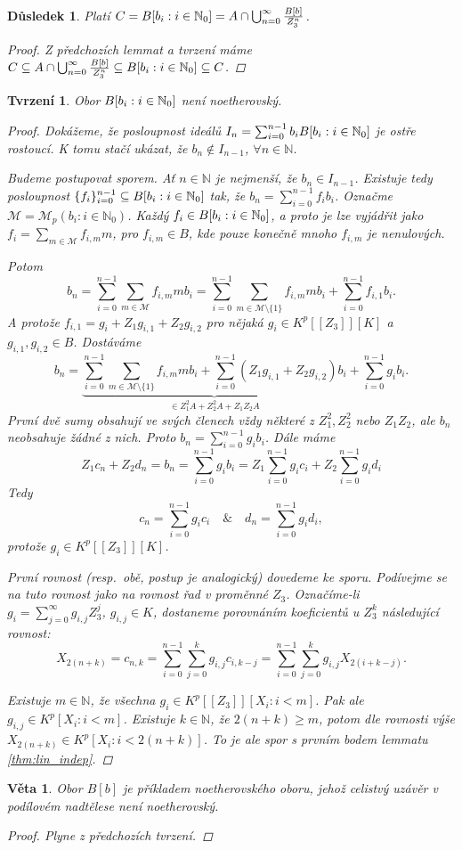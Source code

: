 \documentclass[11pt,a4paper]{article}
\newcommand\m[1]{\mathbb { #1 }} %
\newcommand\p[1]{\mathcal{ #1 }} %
\newcommand\N{\m N}
\newcommand*{\mld}[1]{\[#1\]} %
\newcounter{numb}
\theoremstyle{definition}
\theoremstyle{plain}
\newtheorem{veta}[numb]{Věta}
\newtheorem{tvrzeni}[numb]{Tvrzení}
\newtheorem{dusledek}[numb]{Důsledek}
\begin{document}
\begin{dusledek}
	Platí $C = \Ball = A \cap \bigcup_{n = 0}^\infty \frac{B[b]}{Z_3^n}$.
	
	\begin{proof}
		Z předchozích lemmat a tvrzení máme $C \subseteq A \cap \bigcup_{n = 0}^\infty \frac{B[b]}{Z_3^n} \subseteq \Ball \subseteq C$.
	\end{proof}
\end{dusledek}

\begin{tvrzeni}
	Obor $\Ball$ není noetherovský.
	
	\begin{proof}
		\newcommand*{\I}{_{i = 0}^{n - 1}}

		Dokážeme, že posloupnost ideálů $I_n = \sum\I b_i \Ball$ je ostře rostoucí. K tomu stačí ukázat, že $b_n \notin I_{n - 1}$, $\forall n \in \N$.

		Budeme postupovat sporem. Ať $n \in \N$ je nejmenší, že $b_n \in I_{n - 1}$. Existuje tedy posloupnost $\{f_i\}\I \subseteq \Ball$ tak, že $b_n = \sum\I f_i b_i$. Označme $\p M = \p M_p(b_i: i \in \N_0)$. Každý $f_i \in \Ball$, a proto je lze vyjádřit jako $f_i = \sum_{m \in \p M} f_{i, m} m$, pro $f_{i, m} \in B$, kde pouze konečně mnoho $f_{i, m}$ je nenulových.

		Potom
		\mld{
			b_n = \sum\I \sum_{m \in \p M} f_{i, m} m b_i = \sum\I \sum_{m \in \p M \setminus \{1\}} f_{i, m} m b_i + \sum\I f_{i, 1} b_i.
		}
		A protože $f_{i, 1} = g_i + Z_1 g_{i, 1} + Z_2 g_{i, 2}$ pro nějaká $g_i \in K^p[[Z_3]][K]$ a $g_{i, 1}, g_{i, 2} \in B$. Dostáváme
		\mld{
			b_n = \underbrace{\sum\I \sum_{m \in \p M \setminus \{1\}} f_{i, m} m b_i + \sum\I \left(Z_1 g_{i, 1} + Z_2 g_{i, 2}\right)b_i}_{\in Z_1^2 A + Z_2^2 A + Z_1 Z_2 A} + \sum\I g_i b_i.
		}
		První dvě sumy obsahují ve svých členech vždy některé z $Z_1^2, Z_2^2$ nebo
		$Z_1 Z_2$, ale $b_n$ neobsahuje žádné z nich. Proto $b_n = \sum\I g_i b_i$. Dále máme
		\mld{
			Z_1 c_n + Z_2 d_n = b_n = \sum\I g_i b_i = Z_1 \sum\I g_i c_i + Z_2 \sum\I g_i d_i
		}
		Tedy
		\mld{
			c_n = \sum\I g_i c_i \quad \& \quad d_n = \sum\I g_i d_i,
		}
		protože $g_i \in K^p[[Z_3]][K]$.

		První rovnost (resp.\ obě, postup je analogický) dovedeme ke sporu. Podívejme se na tuto rovnost jako na rovnost řad v proměnné $Z_3$. Označíme-li $g_i = \sum_{j = 0}^\infty g_{i, j} Z_3^j$, $g_{i, j} \in K$, dostaneme porovnáním koeficientů u $Z_3^k$ následující rovnost:
		\mld{
			X_{2(n + k)} = c_{n, k} = \sum\I \sum_{j = 0}^k g_{i, j} c_{i, k - j} = \sum\I \sum_{j = 0}^k g_{i, j} X_{2(i + k - j)}.
		}
		
		Existuje $m \in \N$, že všechna $g_i \in K^p[[Z_3]][X_i: i < m]$. Pak ale $g_{i, j} \in K^p[X_i: i < m]$. Existuje $k \in \N$, že $2(n + k) \geq m$, potom dle rovnosti výše $X_{2(n + k)} \in K^p[X_i: i < 2(n + k)]$. To je ale spor s prvním bodem lemmatu \ref{thm:lin_indep}.
	\end{proof}
\end{tvrzeni}

\begin{veta}
	Obor $B[b]$ je příkladem noetherovského oboru, jehož celistvý uzávěr v podílovém nadtělese není noetherovský.
	
	\begin{proof}
		Plyne z předchozích tvrzení.
	\end{proof}
\end{veta}
\end{document}
